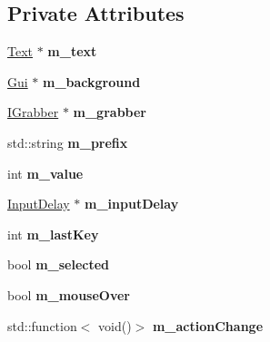 \subsection*{Private Attributes}
\begin{DoxyCompactItemize}
\item 
\mbox{\label{class_flounder_1_1_input_grabber_ac8832ba51fe9e2a75cff44c8500dbd4b}} 
\hyperlink{class_flounder_1_1_text}{Text} $\ast$ {\bfseries m\+\_\+text}
\item 
\mbox{\label{class_flounder_1_1_input_grabber_aa77840790073de9ec86c0df6ed08c2dc}} 
\hyperlink{class_flounder_1_1_gui}{Gui} $\ast$ {\bfseries m\+\_\+background}
\item 
\mbox{\label{class_flounder_1_1_input_grabber_a60a124fb3bd8ac9ddc3d6def929e2ca5}} 
\hyperlink{class_flounder_1_1_i_grabber}{I\+Grabber} $\ast$ {\bfseries m\+\_\+grabber}
\item 
\mbox{\label{class_flounder_1_1_input_grabber_ae262c6a1a3e9c4f5f72f67790007fae7}} 
std\+::string {\bfseries m\+\_\+prefix}
\item 
\mbox{\label{class_flounder_1_1_input_grabber_a84cfa77f4d8e3bb0376b7593ba417bb5}} 
int {\bfseries m\+\_\+value}
\item 
\mbox{\label{class_flounder_1_1_input_grabber_a0fe836298a752b949dabe223cfa04024}} 
\hyperlink{class_flounder_1_1_input_delay}{Input\+Delay} $\ast$ {\bfseries m\+\_\+input\+Delay}
\item 
\mbox{\label{class_flounder_1_1_input_grabber_a11566e1db2cf415af25d84b6c7b57785}} 
int {\bfseries m\+\_\+last\+Key}
\item 
\mbox{\label{class_flounder_1_1_input_grabber_a28af1b2b931ea43dc5c496675d483707}} 
bool {\bfseries m\+\_\+selected}
\item 
\mbox{\label{class_flounder_1_1_input_grabber_a03c57bcc2ec79ffd478e1ef2caca1454}} 
bool {\bfseries m\+\_\+mouse\+Over}
\item 
\mbox{\label{class_flounder_1_1_input_grabber_abbb5f1a88de70eafb250947469ec003a}} 
std\+::function$<$ void()$>$ {\bfseries m\+\_\+action\+Change}
\end{DoxyCompactItemize}
